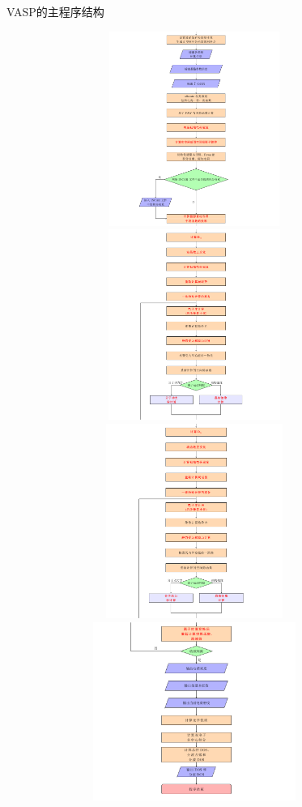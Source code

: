 {\begin{frame}[allowframebreaks]{\textrm{VASP}的主程序结构}
\begin{figure}[h!]
\includegraphics[height=2.50in,width=4.0in,viewport=0 0 562 370,clip]{Figures/VASP_main_Flow-2.png}
\includegraphics[height=2.45in,width=4.0in,viewport=0 350 562 660,clip]{Figures/VASP_main_Flow-3.png}
\includegraphics[height=2.50in,width=4.0in,viewport=0 0 562 350,clip]{Figures/VASP_main_Flow-3.png}
\includegraphics[height=2.30in,width=4.0in,viewport=0 215 562 530,clip]{Figures/VASP_main_Flow-4.png}

\end{figure}
\end{frame}}
